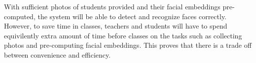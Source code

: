 With sufficient photos of students provided and their facial embeddings pre-computed,
the system will be able to detect and recognize faces correctly. However, to save time
in classes, teachers and students will have to spend equivilently extra amount of time
before classes on the tasks such as collecting photos and pre-computing facial embeddings.
This proves that there is a trade off between convenience and efficiency.
